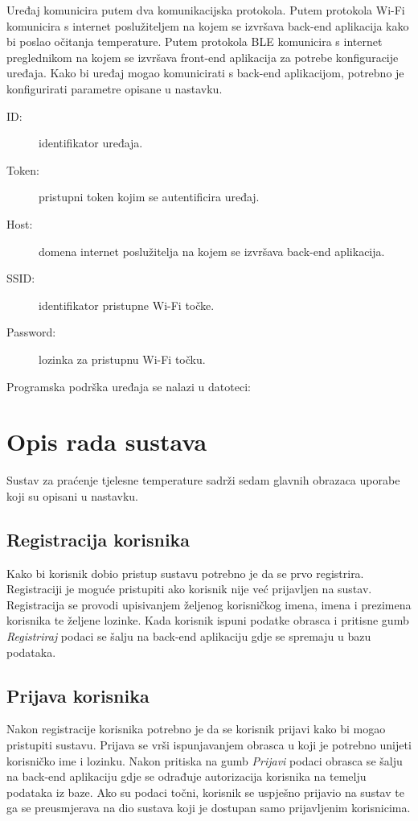 \documentclass[times, utf8, diplomski]{fer}
\begin{document}
Uređaj komunicira putem dva komunikacijska protokola. Putem protokola Wi-Fi komunicira s internet poslužiteljem na kojem se izvršava back-end aplikacija kako bi poslao očitanja temperature. Putem protokola BLE komunicira s internet preglednikom na kojem se izvršava front-end aplikacija za potrebe konfiguracije uređaja. Kako bi uređaj mogao komunicirati s back-end aplikacijom, potrebno je konfigurirati parametre opisane u nastavku.
\begin{description}
    \item[ID:] identifikator uređaja.
    \item[Token:] pristupni token kojim se autentificira uređaj.
    \item[Host:] domena internet poslužitelja na kojem se izvršava back-end aplikacija.
    \item[SSID:] identifikator pristupne Wi-Fi točke.
    \item[Password:] lozinka za pristupnu Wi-Fi točku.
\end{description}

Programska podrška uređaja se nalazi u datoteci: 

\section{Opis rada sustava}
Sustav za praćenje tjelesne temperature sadrži sedam glavnih obrazaca uporabe koji su opisani u nastavku.

\subsection{Registracija korisnika}
Kako bi korisnik dobio pristup sustavu potrebno je da se prvo registrira. Registraciji je moguće pristupiti ako korisnik nije već prijavljen na sustav. Registracija se provodi upisivanjem željenog korisničkog imena, imena i prezimena korisnika te željene lozinke. Kada korisnik ispuni podatke obrasca i pritisne gumb \emph{Registriraj} podaci se šalju na back-end aplikaciju gdje se spremaju u bazu podataka.

\subsection{Prijava korisnika}
Nakon registracije korisnika potrebno je da se korisnik prijavi kako bi mogao pristupiti sustavu. Prijava se vrši ispunjavanjem obrasca u koji je potrebno unijeti korisničko ime i lozinku. Nakon pritiska na gumb \emph{Prijavi} podaci obrasca se šalju na back-end aplikaciju gdje se odrađuje autorizacija korisnika na temelju podataka iz baze. Ako su podaci točni, korisnik se uspješno prijavio na sustav te ga se preusmjerava na dio sustava koji je dostupan samo prijavljenim korisnicima. 
\end{document}
